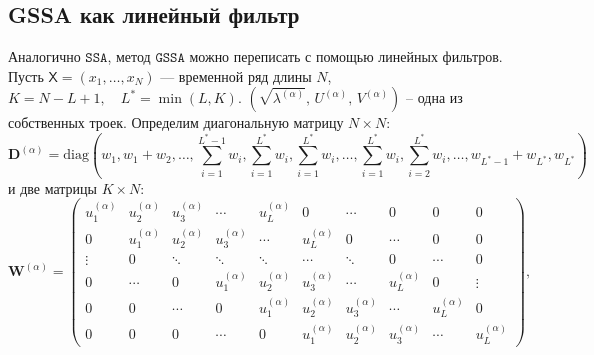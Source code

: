 \documentclass[12pt, specialist, subf
]{disser}
\theoremstyle{definition}
\newcommand{\SSA}{\texttt{SSA}}
\newcommand{\GSSA}{\texttt{GSSA}}
\newcommand{\TS}{\mathsf{X}}
\begin{document}
\subsection{GSSA как линейный фильтр}
Аналогично $\SSA$, метод $\GSSA$ можно переписать с помощью линейных фильтров.
Пусть $\TS = (x_1, \dots, x_{N})$ --- временной ряд длины $N$, $K = N - L + 1, \quad L^{*} = \min(L, K)$. $(\sqrt{\lambda^{(\alpha)}},\,U^{(\alpha)},\,V^{(\alpha)})$ -- одна из собственных троек. Определим диагональную матрицу $N \times N$:
$$
	\mathbf{D}^{(\alpha)} = \text{diag}(w_1, w_1 + w_2, \ldots,
	\sum \limits_{i = 1}^{L^*-1}w_i,
	\sum \limits_{i = 1}^{L^*}w_i, \sum \limits_{i = 1}^{L^*}w_i, \ldots, \sum \limits_{i = 1}^{L^*}w_i,
	\sum \limits_{i = 2}^{L^*}w_i, \ldots, w_{L^*-1}+ w_{L^*}, w_{L^*})
$$
и две матрицы  $K \times N$:
\[
	\mathbf{W}^{(\alpha)} = \begin{pmatrix}
		u_{1}^{(\alpha)} & u_{2}^{(\alpha)} & u_{3}^{(\alpha)} & \cdots           & u_{L}^{(\alpha)} & 0                & \cdots           & 0                & 0                & 0                \\
		0                & u_{1}^{(\alpha)} & u_{2}^{(\alpha)} & u_{3}^{(\alpha)} & \cdots           & u_{L}^{(\alpha)} & 0                & \cdots           & 0                & 0                \\
		\vdots           & 0                & \ddots           & \ddots           & \ddots           & \cdots           & \ddots           & 0                & \cdots           & 0                \\
		0                & \cdots           & 0                & u_{1}^{(\alpha)} & u_{2}^{(\alpha)} & u_{3}^{(\alpha)} & \cdots           & u_{L}^{(\alpha)} & 0                & \vdots           \\
		0                & 0                & \cdots           & 0                & u_{1}^{(\alpha)} & u_{2}^{(\alpha)} & u_{3}^{(\alpha)} & \cdots           & u_{L}^{(\alpha)} & 0                \\
		0                & 0                & 0                & \cdots           & 0                & u_{1}^{(\alpha)} & u_{2}^{(\alpha)} & u_{3}^{(\alpha)} & \cdots           & u_{L}^{(\alpha)}
	\end{pmatrix},
\]
\end{document}
